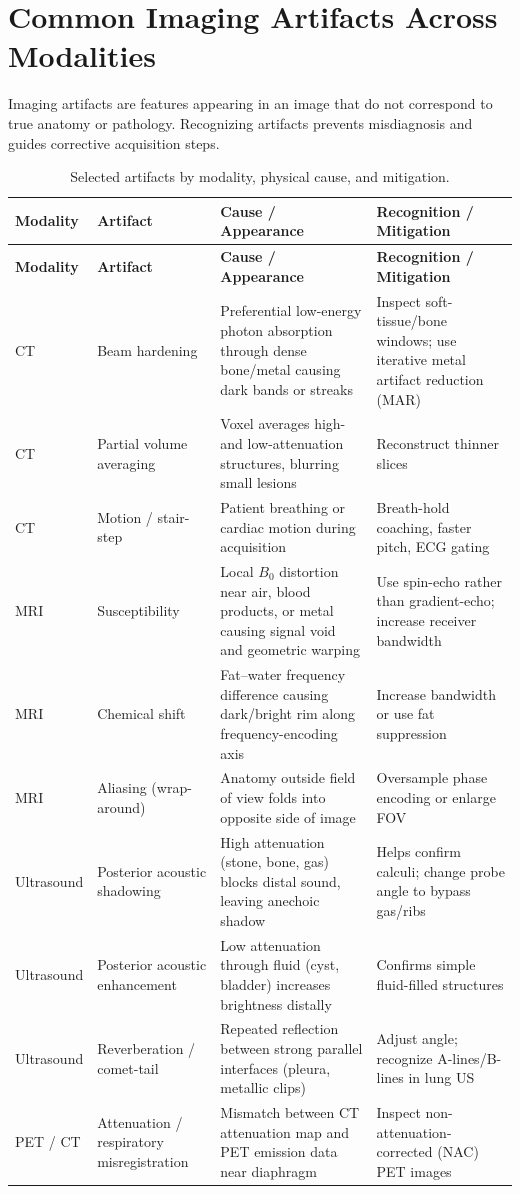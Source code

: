 \chapter{Common Imaging Artifacts Across Modalities}
\label{app:imaging_artifacts}

Imaging artifacts are features appearing in an image that do not correspond to true anatomy or pathology. Recognizing artifacts prevents misdiagnosis and guides corrective acquisition steps.

\begin{longtable}{@{}p{}p{}p{}p{}@{}}
\caption{Selected artifacts by modality, physical cause, and mitigation.}
\label{tab:app_artifacts} \\
\toprule
\textbf{Modality} & \textbf{Artifact} & \textbf{Cause / Appearance} & \textbf{Recognition / Mitigation} \\
\midrule
\endfirsthead
\toprule
\textbf{Modality} & \textbf{Artifact} & \textbf{Cause / Appearance} & \textbf{Recognition / Mitigation} \\
\midrule
\endhead
CT & Beam hardening & Preferential low-energy photon absorption through dense bone/metal causing dark bands or streaks & Inspect soft-tissue/bone windows; use iterative metal artifact reduction (MAR) \\
CT & Partial volume averaging & Voxel averages high- and low-attenuation structures, blurring small lesions & Reconstruct thinner slices \\
CT & Motion / stair-step & Patient breathing or cardiac motion during acquisition & Breath-hold coaching, faster pitch, ECG gating \\
MRI & Susceptibility & Local $B_0$ distortion near air, blood products, or metal causing signal void and geometric warping & Use spin-echo rather than gradient-echo; increase receiver bandwidth \\
MRI & Chemical shift & Fat--water frequency difference causing dark/bright rim along frequency-encoding axis & Increase bandwidth or use fat suppression \\
MRI & Aliasing (wrap-around) & Anatomy outside field of view folds into opposite side of image & Oversample phase encoding or enlarge FOV \\
Ultrasound & Posterior acoustic shadowing & High attenuation (stone, bone, gas) blocks distal sound, leaving anechoic shadow & Helps confirm calculi; change probe angle to bypass gas/ribs \\
Ultrasound & Posterior acoustic enhancement & Low attenuation through fluid (cyst, bladder) increases brightness distally & Confirms simple fluid-filled structures \\
Ultrasound & Reverberation / comet-tail & Repeated reflection between strong parallel interfaces (pleura, metallic clips) & Adjust angle; recognize A-lines/B-lines in lung US \\
PET / CT & Attenuation / respiratory misregistration & Mismatch between CT attenuation map and PET emission data near diaphragm & Inspect non-attenuation-corrected (NAC) PET images \\
\bottomrule
\end{longtable}
